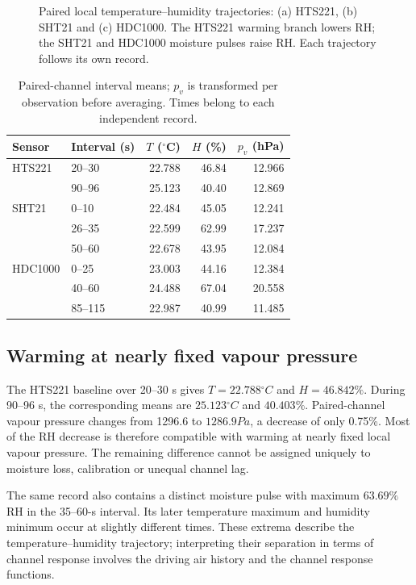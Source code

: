 \begin{figure}[t]
\centering

\caption{Paired local temperature--humidity trajectories: (a) HTS221, (b) SHT21 and (c) HDC1000. The HTS221 warming branch lowers RH; the SHT21 and HDC1000 moisture pulses raise RH. Each trajectory follows its own record.}
\label{fig:temperature-humidity-states}
\end{figure}

\begin{table}[t]
\caption{Paired-channel interval means; $p_v$ is transformed per observation before averaging. Times belong to each independent record.}
\label{tab:temperature-humidity-states}
\centering\small
\begin{tabular}{@{}llrrr@{}}
\toprule
Sensor & Interval (s) & $T$ ($^\circ$C) & $H$ (\%) & $p_v$ (hPa)\\
\midrule
HTS221 & 20--30 & 22.788 & 46.84 & 12.966\\
 & 90--96 & 25.123 & 40.40 & 12.869\\
SHT21 & 0--10 & 22.484 & 45.05 & 12.241\\
 & 26--35 & 22.599 & 62.99 & 17.237\\
 & 50--60 & 22.678 & 43.95 & 12.084\\
HDC1000 & 0--25 & 23.003 & 44.16 & 12.384\\
 & 40--60 & 24.488 & 67.04 & 20.558\\
 & 85--115 & 22.987 & 40.99 & 11.485\\
\bottomrule
\end{tabular}
\end{table}

\subsection{Warming at nearly fixed vapour pressure}
The HTS221 baseline over 20--30 s gives $T=22.788\unit{^\circ C}$ and $H=46.842\%$. During 90--96 s, the corresponding means are $25.123\unit{^\circ C}$ and $40.403\%$. Paired-channel vapour pressure changes from 1296.6 to $1286.9\unit{Pa}$, a decrease of only 0.75\%. Most of the RH decrease is therefore compatible with warming at nearly fixed local vapour pressure. The remaining difference cannot be assigned uniquely to moisture loss, calibration or unequal channel lag.

The same record also contains a distinct moisture pulse with maximum $63.69\%$ RH in the 35--60-s interval. Its later temperature maximum and humidity minimum occur at slightly different times. These extrema describe the temperature--humidity trajectory; interpreting their separation in terms of channel response involves the driving air history and the channel response functions.

